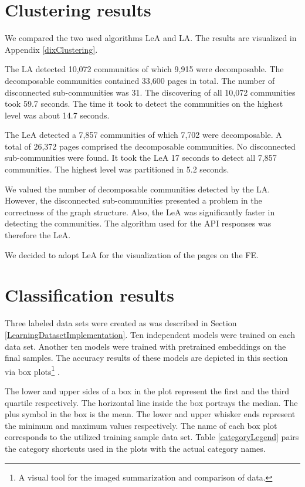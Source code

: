 \label{evaluation}
\section{Clustering results}\label{clusteringEvaluation}
We compared the two used algorithms LeA and LA. The results are visualized in Appendix \ref{dixClustering}.

The LA detected 10,072 communities of which 9,915 were decomposable. The decomposable communities contained 33,600 pages in total. The number of disconnected sub-communities was 31. The discovering of all 10,072 communities took 59.7 seconds. The time it took to detect the communities on the highest level was about 14.7 seconds. 

The LeA detected a 7,857 communities of which 7,702 were decomposable. A total of 26,372 pages comprised the decomposable communities. No disconnected sub-communities were found. It took the LeA 17 seconds to detect all 7,857 communities. The highest level was partitioned in 5.2 seconds. 

We valued the number of decomposable communities detected by the LA. However, the disconnected sub-communities presented a problem in the correctness of the graph structure. Also, the LeA was significantly faster in detecting the communities. The algorithm used for the API responses was therefore the LeA. 

We decided to adopt LeA for the visualization of the pages on the FE. 

\section{Classification results}\label{classificationEvaluation}
Three labeled data sets were created as was described in Section \ref{LearningDatasetImplementation}. Ten independent models were trained on each data set. Another ten models were trained with pretrained embeddings on the final samples. The accuracy results of these models are depicted in this section via box plots\footnote{A visual tool for the imaged summarization and comparison of data.} \cite{boxplot}. 

The lower and upper sides of a box in the plot represent the first and the third quartile respectively. The horizontal line inside the box portrays the median. The plus symbol in the box is the mean. The lower and upper whisker ends represent the minimum and maximum values respectively. The name of each box plot corresponds to the utilized training sample data set. Table \ref{categoryLegend} pairs the category shortcuts used in the plots with the actual category names. 

